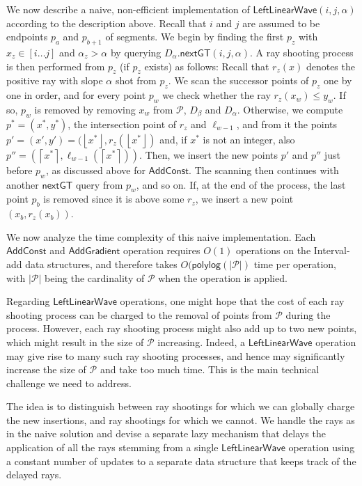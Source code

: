 \documentclass[10pt,a4paper]{article}
\newcommand{\AC}{\mathsf{AddConst}}
\newcommand{\AG}{\mathsf{AddGradient}}
\newcommand{\LLW}{\mathsf{LeftLinearWave}}
\newcommand{\local}{\text{short }}
\newcommand{\longrange}{\text{long }}
\newcommand{\nextGT}{\mathsf{nextGT}}
\renewcommand{\P}{\mathcal{P}}
\newcommand{\ray}{r}
\newcommand{\ceil}[1]{\left\lceil{#1}\right\rceil}
\newcommand{\floor}[1]{\left\lfloor{#1}\right\rfloor}
\newcommand{\polylog}{\mathsf{polylog}}
\begin{document}
We now describe a naive, non-efficient implementation of $\LLW(i,j,\alpha)$ according to the description above.  
Recall that $i$ and $j$ are assumed to be endpoints $p_a$ and $p_{b+1}$ of segments. 
We begin by finding the first $p_z$ with $x_z\in[i\ldots j]$ and $\alpha_z>\alpha$ by querying $D_{\alpha}.\nextGT(i,j,\alpha)$. A ray shooting process is then performed from $p_z$ (if $p_z$ exists) as follows:
Recall that $\ray_z(x)$ denotes the positive ray with slope $\alpha$ shot from $p_z$.
We scan the successor points of $p_z$ one by one in order, and for every point $p_w$ we check whether the ray $\ray_z(x_w)\leq y_w$.
If so, $p_w$ is removed by  removing $x_w$ from $\P$, $D_{\beta}$ and $D_{\alpha}$.
Otherwise, we compute $p^*=(x^*,y^*)$, the intersection point of $\ray_z$ and $\ell_{w-1}$, and from it the points $p' = (x',y')=(\floor{x^*},\ray_z(\floor{x^*})$ and, if $x^*$ is not an integer, also $p''=(\ceil{x^*},\ell_{w-1}(\ceil{x^*}))$.
Then, we insert the new points $p'$ and $p''$ just before $p_w$, as discussed above for $\AC$.
The scanning then continues with another $\nextGT$ query from $p_w$, and so on.
If, at the end of the process, the last point $p_b$ is removed since it is above some $\ray_z$, we insert a new point $(x_b,\ray_z(x_b))$.

We now analyze the time complexity of this naive implementation. Each $\AC$ and $\AG$ operation requires $O(1)$ operations on the Interval-add data structures, and therefore takes $O(\polylog(|\P|)$ time per operation, with $|\P|$ being the cardinality of $\P$ when the operation is applied. 

Regarding $\LLW$ operations, one might hope that the cost of each ray shooting process can be charged to the removal of points from $\P$ during the process. However, each ray shooting process might also add up to two new points, which might result in the size of $\P$ increasing. 
Indeed, a $\LLW$ operation may give rise to many such ray shooting processes, and hence may significantly increase the size of $\P$ and take too much time. This is the main technical challenge we need to address.

The idea is to  distinguish between {\em \longrange}ray shootings for which we can globally charge the new insertions, and {\em \local}ray shootings for which we cannot. We handle the \longrange rays as in the naive solution and devise a separate lazy mechanism that delays the application of all the \local rays stemming from a single $\LLW$ operation using a constant number of updates to a separate data structure that keeps track of the delayed rays. 
\end{document}
